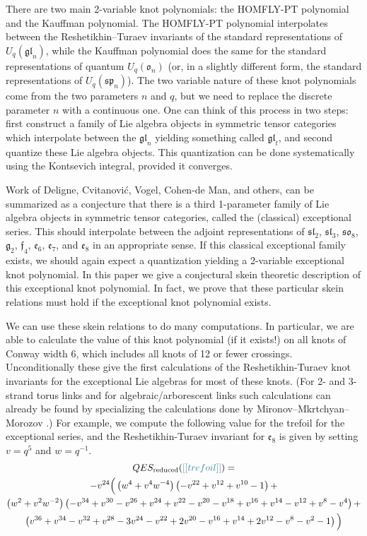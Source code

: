 \documentclass[12pt]{amsart}
\begin{document}
There are two main 2-variable knot polynomials: the HOMFLY-PT polynomial and
the Kauffman polynomial.  The HOMFLY-PT polynomial interpolates between the
Reshetikhin--Turaev invariants of the standard representations of
$U_q(\mathfrak{gl}_n)$, while the Kauffman polynomial does the same for the
standard representations of quantum $U_q(\mathfrak{o}_n)$ (or, in a slightly
different form, the standard representations of $U_q(\mathfrak{sp}_n)$).  The
two variable nature of these knot polynomials come from the two parameters $n$
and $q$, but we need to replace the discrete parameter $n$ with a continuous
one.   One can think of this process in two steps: first construct a family of
Lie algebra objects in symmetric tensor categories which interpolate between
the $\mathfrak{gl}_n$ yielding something called $\mathfrak{gl}_t$, and second
quantize these Lie algebra objects.   This quantization can be done
systematically using the Kontsevich integral, provided it converges.

Work of Deligne, Cvitanović, Vogel, Cohen-de Man, and others, can be
summarized as a conjecture that there is a third 1-parameter family of Lie
algebra objects in symmetric tensor categories, called the (classical)
exceptional series. This should interpolate between the adjoint
representations of $\mathfrak{sl}_2$, $\mathfrak{sl}_3$, $\mathfrak{so}_8$,
$\mathfrak{g}_2$, $\mathfrak{f}_4$, $\mathfrak{e}_6$, $\mathfrak{e}_7$, and
$\mathfrak{e}_8$ in an appropriate sense.  If this classical exceptional
family exists, we should again expect a quantization yielding a 2-variable
exceptional knot polynomial.  In this paper we give a conjectural skein
theoretic description of this exceptional knot polynomial. In fact, we prove
that these particular skein relations must hold if the exceptional knot
polynomial exists.

We can use these skein relations to do many computations.  In particular, we
are able to calculate the value of this knot polynomial (if it exists!) on all
knots of Conway width 6, which includes all knots of 12 or fewer crossings.
Unconditionally these give the first calculations of the Reshetikhin-Turaev
knot invariants for the exceptional Lie algebras for most of these knots.  
(For 2- and 3-strand torus links and for algebraic/arborescent links such
calculations can already be found by specializing the calculations done by
Mironov--Mkrtchyan--Morozov \cite{MR3491191,MR3475991}.)
For example, we compute the following value for the trefoil for the exceptional
series, and the Reshetikhin-Turaev invariant for $\mathfrak{e}_8$ is given by
setting $v=q^5$ and $w=q^{-1}$.
\begin{multline*}
QES_{\text{reduced}}(\nn{trefoil}) = \\
-v^{24}
\Big(
    \left(w^4 + v^4 w^{-4}\right)\left(-v^{22}+v^{12}+v^{10}-1\right)+\\
    \left(w^2 + v^2 w^{-2}\right)\left(-v^{34}+v^{30}-v^{26}+v^{24}+v^{22}-v^{20}-v^{18}+v^{16}+v^{14}-v^{12}+v^8-v^4\right)+\\
    \left(v^{36}+v^{34}-v^{32}+v^{28}-3 v^{24}-v^{22}+2 v^{20}-v^{16}+v^{14}+2 v^{12}-v^8-v^2-1\right)
    \Big)
\end{multline*}
\end{document}
